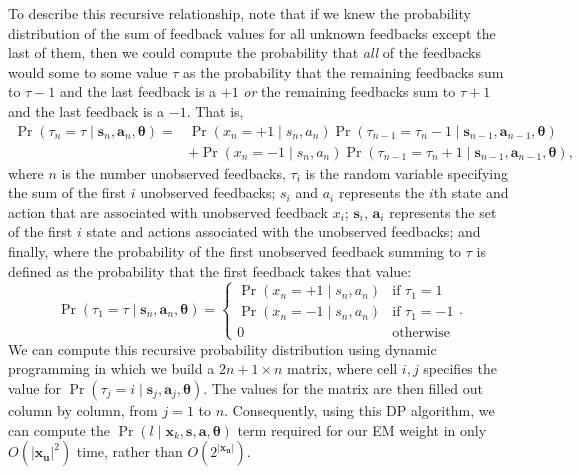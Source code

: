 To describe this recursive relationship, note that if we knew the probability distribution of the sum of feedback values for all unknown feedbacks except the last of them, then we could compute the probability that {\em all} of the feedbacks would some to some value $\tau$ as the probability that the remaining feedbacks sum to $\tau - 1$ and the last feedback is a $+1$ {\em or} the remaining feedbacks sum to $\tau + 1$ and the last feedback is a $-1$. That is,
\begin{align}
\Pr(\tau_n = \tau \mid \bm{s}_n, \bm{a}_n, \bm{\theta}) =& \Pr(x_n = +1 \mid s_n, a_n) \Pr(\tau_{n-1} = \tau_n - 1 \mid \bm{s}_{n-1}, \bm{a}_{n-1}, \bm{\theta}) \nonumber \\
& + \Pr(x_n = -1 \mid s_n, a_n) \Pr(\tau_{n-1} = \tau_n + 1 \mid \bm{s}_{n-1}, \bm{a}_{n-1}, \bm{\theta}), 
\end{align}
where $n$ is the number unobserved feedbacks, $\tau_i$ is the random variable specifying the sum of the first $i$ unobserved feedbacks; $s_i$ and $a_i$ represents the $i$th state and action that are associated with unobserved feedback $x_i$; $\bm{s}_i$, $\bm{a}_i$ represents the set of the first $i$ state and actions associated with the unobserved feedbacks; and finally, where the probability of the first unobserved feedback summing to $\tau$ is defined as the probability that the first feedback takes that value:
\begin{equation}
\Pr(\tau_1 = \tau \mid \bm{s}_n, \bm{a}_n, \bm{\theta}) = \begin{cases}
\Pr(x_n = +1 \mid s_n, a_n) & \mbox{if } \tau_1 = 1 \\
\Pr(x_n = -1 \mid s_n, a_n) & \mbox{if } \tau_1 = -1 \\
0 & \mbox{otherwise}
\end{cases}.
\end{equation}
We can compute this recursive probability distribution using dynamic programming in which we build a $2n+1 \times n$ matrix, where cell $i,j$ specifies the value for $\Pr(\tau_j = i \mid \bm{s}_j, \bm{a}_j, \bm{\theta})$. The values for the matrix are then filled out column by column, from $j=1$ to $n$. Consequently, using this DP algorithm, we can compute the $\Pr(l \mid \bm{x}_k, \bm{s}, \bm{a}, \bm{\theta})$ term required for our EM weight in only $O(|\bm{x_u}|^2)$ time, rather than $O(2^{|\bm{x_u}|})$.


